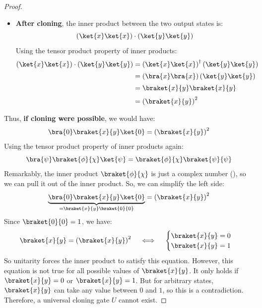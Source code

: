 \begin{deepeningbox}
\begin{proof}
\begin{itemize}
            \item \textbf{After cloning}, the inner product between the two output states is:
            \begin{equation*}
                \left(\ket{x}\ket{x}\right) \cdot \left(\ket{y}\ket{y}\right)
            \end{equation*}
            Using the tensor product property of inner products:
            \begin{align*}
                \left(\ket{x}\ket{x}\right) \cdot \left(\ket{y}\ket{y}\right) &=
                \left(\ket{x}\ket{x}\right)^{\dagger}\left(\ket{y}\ket{y}\right) \\[.2em]
                &=
                \left(\bra{x}\bra{x}\right)\left(\ket{y}\ket{y}\right) \\[.2em]
                &=
                \braket{x}{y} \braket{x}{y} \\[.2em]
                &=
                \left(\braket{x}{y}\right)^2
            \end{align*}
        \end{itemize}
        Thus, \textbf{if cloning were possible}, we would have:
        \begin{equation*}
            \bra{0}\braket{x}{y}\ket{0} = \left(\braket{x}{y}\right)^2
        \end{equation*}
        Using the tensor product property of inner products again:
        \begin{equation*}
            \bra{\psi} \braket{\phi}{\chi} \ket{\psi} = \braket{\phi}{\chi} \braket{\psi}{\psi}
        \end{equation*}
        Remarkably, the inner product $\braket{\phi}{\chi}$ is just a complex number (), so we can pull it out of the inner product. So, we can simplify the left side:
        \begin{equation*}
            \underbrace{\bra{0}\braket{x}{y}\ket{0}}_{= \braket{x}{y} \braket{0}{0}} = \left(\braket{x}{y}\right)^{2}
        \end{equation*}
        Since $\braket{0}{0} = 1$, we have:
        \begin{equation*}
            \braket{x}{y} = \left(\braket{x}{y}\right)^{2}
            \quad
            \iff
            \quad
            \begin{cases}
                \braket{x}{y} = 0 \\
                \braket{x}{y} = 1
            \end{cases}
        \end{equation*}
        So unitarity forces the inner product to satisfy this equation. However, this equation is not true for all possible values of $\braket{x}{y}$. It only holds if $\braket{x}{y} = 0$ or $\braket{x}{y} = 1$. But for arbitrary states, $\braket{x}{y}$ can take any value between $0$ and $1$, so this is a contradiction. Therefore, a universal cloning gate $U$ cannot exist.
    \end{proof}
\end{deepeningbox}

